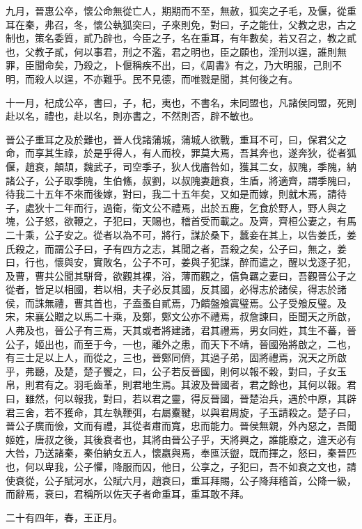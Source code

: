 \begin{pinyinscope}
九月，晉惠公卒，懷公命無從亡人，期期而不至，無赦，狐突之子毛，及偃，從重耳在秦，弗召，冬，懷公執狐突曰，子來則免，對曰，子之能仕，父教之忠，古之制也，策名委質，貳乃辟也，今臣之子，名在重耳，有年數矣，若又召之，教之貳也，父教子貳，何以事君，刑之不濫，君之明也，臣之願也，淫刑以逞，誰則無罪，臣聞命矣，乃殺之，卜偃稱疾不出，曰，《周書》有之，乃大明服，己則不明，而殺人以逞，不亦難乎。民不見德，而唯戮是聞，其何後之有。

十一月，杞成公卒，書曰，子，杞，夷也，不書名，未同盟也，凡諸侯同盟，死則赴以名，禮也，赴以名，則亦書之，不然則否，辟不敏也。

晉公子重耳之及於難也，晉人伐諸蒲城，蒲城人欲戰，重耳不可，曰，保君父之命，而享其生祿，於是乎得人，有人而校，罪莫大焉，吾其奔也，遂奔狄，從者狐偃，趙衰，顛頡，魏武子，司空季子，狄人伐廧咎如，獲其二女，叔隗，季隗，納諸公子，公子取季隗，生伯鯈，叔劉，以叔隗妻趙衰，生盾，將適齊，謂季隗曰，待我二十五年不來而後嫁，對曰，我二十五年矣，又如是而嫁，則就木焉，請待子，處狄十二年而行，過衛，衛文公不禮焉，出於五鹿，乞食於野人，野人與之塊，公子怒，欲鞭之，子犯曰，天賜也，稽首受而載之。及齊，齊桓公妻之，有馬二十乘，公子安之。從者以為不可，將行，謀於桑下，蠶妾在其上，以告姜氏，姜氏殺之，而謂公子曰，子有四方之志，其聞之者，吾殺之矣，公子曰，無之，姜曰，行也，懷與安，實敗名，公子不可，姜與子犯謀，醉而遣之，醒以戈逐子犯，及曹，曹共公聞其駢脅，欲觀其裸，浴，薄而觀之，僖負羈之妻曰，吾觀晉公子之從者，皆足以相國，若以相，夫子必反其國，反其國，必得志於諸侯，得志於諸侯，而誅無禮，曹其首也，子盍蚤自貳焉，乃饋盤飧寘璧焉。公子受飧反璧。及宋，宋襄公贈之以馬二十乘，及鄭，鄭文公亦不禮焉，叔詹諫曰，臣聞天之所啟，人弗及也，晉公子有三焉，天其或者將建諸，君其禮焉，男女同姓，其生不蕃，晉公子，姬出也，而至于今，一也，離外之患，而天下不靖，晉國殆將啟之，二也，有三士足以上人，而從之，三也，晉鄭同儕，其過子弟，固將禮焉，況天之所啟乎，弗聽，及楚，楚子饗之，曰，公子若反晉國，則何以報不穀，對曰，子女玉帛，則君有之。羽毛齒革，則君地生焉。其波及晉國者，君之餘也，其何以報。君曰，雖然，何以報我，對曰，若以君之靈，得反晉國，晉楚治兵，遇於中原，其辟君三舍，若不獲命，其左執鞭弭，右屬櫜鞬，以與君周旋，子玉請殺之。楚子曰，晉公子廣而儉，文而有禮，其從者肅而寬，忠而能力。晉侯無親，外內惡之，吾聞姬姓，唐叔之後，其後衰者也，其將由晉公子乎，天將興之，誰能廢之，違天必有大咎，乃送諸秦，秦伯納女五人，懷嬴與焉，奉匜沃盥，既而揮之，怒曰，秦晉匹也，何以卑我，公子懼，降服而囚，他日，公享之，子犯曰，吾不如衰之文也，請使衰從，公子賦河水，公賦六月，趙衰曰，重耳拜賜，公子降拜稽首，公降一級，而辭焉，衰曰，君稱所以佐天子者命重耳，重耳敢不拜。

二十有四年，春，王正月。


\end{pinyinscope}
